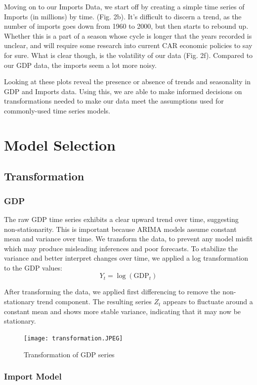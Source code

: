 \documentclass[11pt]{article}
\begin{document}
Moving on to our Imports Data, we start off by creating a simple time series of Imports (in millions) by time. (Fig. 2b). It's difficult to discern a trend, as the number of imports goes down from 1960 to 2000, but then starts to rebound up. Whether this is a part of a season whose cycle is longer that the years recorded is unclear, and will require some research into current CAR economic policies to say for sure. What is clear though, is the volatility of our data (Fig. 2f). Compared to our GDP data, the imports seem a lot more noisy.

Looking at these plots reveal the presence or absence of trends and seasonality in GDP and Imports data. Using this, we are able to make informed decisions on transformations needed to make our data meet the assumptions used for commonly-used time series models.



\section{Model Selection}

\subsection{Transformation}
  \subsubsection{GDP}
   The raw GDP time series exhibits a clear upward trend over time, suggesting non-stationarity. This is important because ARIMA models assume constant mean and variance over time. We transform the data, to prevent any model misfit which may produce misleading inferences and poor forecasts. To stabilize the variance and better interpret changes over time, we applied a log transformation to the GDP values:
\[Y_t = \log(\text{GDP}_t)\]   

After transforming the data, we applied first differencing to remove the non-stationary trend component. The resulting series \( Z_t \) appears to fluctuate around a constant mean and shows more stable variance, indicating that it may now be stationary.


\begin{figure}[H]
  \centering
  \texttt{[image: transformation.JPEG]}
  \caption{Transformation of GDP series} 
  \label{fig:transformation}
\end{figure}

  \subsubsection{Import Model}
\end{document}
